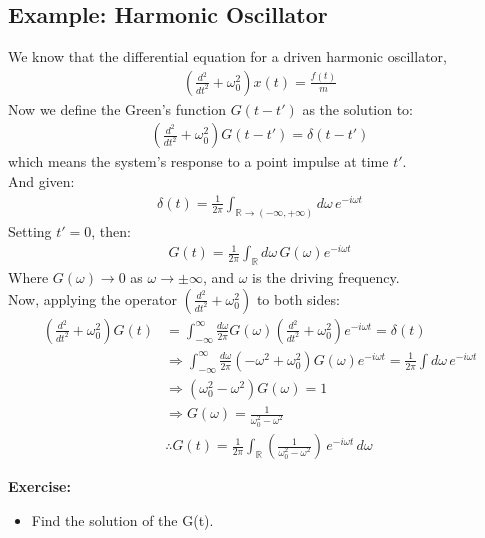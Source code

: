 \documentclass[14pt]{article} %
\begin{document}
{\subsection*{Example: Harmonic Oscillator}

We know that the differential equation for a driven harmonic oscillator,
\begin{align*}
\left( \frac{d^2}{dt^2} + \omega_0^2 \right)x(t) = \frac{f(t)}{m}
\end{align*}
Now we define the Green’s function $G(t - t')$ as the solution to:
\begin{align*}
\left( \frac{d^2}{dt^2} + \omega_0^2 \right)G(t - t') = \delta(t - t')
\end{align*}
which means the system's response to a point impulse at time $t'$.\\

And given:
\begin{align*}
\delta(t) = \frac{1}{2\pi} \int_{\mathbb{R}\to (-\infty,+\infty)} d\omega \, e^{- i\omega t}
\end{align*}
Setting $t' = 0$, then:
\begin{align*}
G(t) = \frac{1}{2\pi} \int_{\mathbb{R}} d\omega \, G(\omega) e^{-i\omega t}
\end{align*}
Where $G(\omega) \to 0$ as $\omega \to \pm \infty$, and $\omega$ is the driving frequency. \\

Now, applying the operator $\left( \frac{d^2}{dt^2} + \omega_0^2 \right)$ to both sides:
\begin{align*}
\left( \frac{d^2}{dt^2} + \omega_0^2 \right) G(t) &= \int_{-\infty}^{\infty} \frac{d\omega}{2\pi}G(\omega) \left( \frac{d^2}{dt^2}+\omega_0^2 \right) e^{-i\omega t}
= \delta(t) \\
&\Rightarrow \int_{-\infty}^{\infty} \frac{d\omega}{2\pi} \left( -\omega^2 + \omega_0^2 \right) G(\omega) e^{-i\omega t}
= \frac{1}{2\pi} \int d\omega \, e^{ -i \omega t } \\
& \Rightarrow 
\left( \omega_0^2 - \omega^2 \right) G(\omega) = 1 \\
& \Rightarrow G(\omega) = \frac{1}{\omega_0^2 - \omega^2} \\
& \therefore G(t) = \frac{1}{2\pi} \int_{\mathbb{R}} \left( \frac{1}{\omega_0^2 - \omega^2}\right) \, e^{-i\omega t} \, d\omega
\end{align*}
\begin{tcolorbox}
\noindent \textbf{Exercise:}
\begin{itemize}
    \item Find the solution of the G(t).
\end{itemize}
\end{tcolorbox}

}
\end{document}

